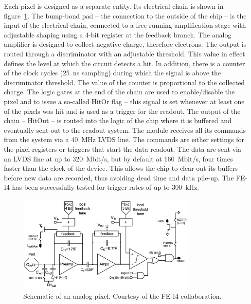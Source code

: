 Each pixel is designed as a separate entity. Its electrical chain is shown in figure~\ref{fig:anapix}. The bump-bond pad -- the connection to the outside of the chip -- is the input of the electrical chain, connected to a free-running amplification stage with adjustable shaping using a 4-bit register at the feedback branch. The analog amplifier is designed to collect negative charge, therefore electrons. The output is routed through a discriminator with an adjustable threshold. This value in effect defines the level at which the circuit detects a hit. In addition, there is a counter of the clock cycles (25~ns sampling) during which the signal is above the discriminator threshold. The value of the counter is proportional to the collected charge. The logic gates at the end of the chain are used to enable/disable the pixel and to issue a so-called HitOr flag -- this signal is set whenever at least one of the pixels was hit and is used as a trigger for the readout. The output of the chain -- HitOut -- is routed into the logic of the chip where it is buffered and eventually sent out to the readout system. The module receives all its commands from the system via a 40~MHz LVDS line. The commands are either settings for the pixel registers or triggers that start the data readout. The data are sent via an LVDS line at up to 320~Mbit/s, but by default at 160~Mbit/s, four times faster than the clock of the device. This allows the chip to clear out its buffers before new data are recorded, thus avoiding dead time and data pile-up. The FE-I4 has been successfully tested for trigger rates of up to 300~kHz. 

\begin{figure}[!t]
\centering
\includegraphics[width=0.8\textwidth]{04_charge_monitoring/pics/analogPix}
\caption{Schematic of an analog pixel. Courtesy of the FE-I4 collaboration.}
\label{fig:anapix}
\end{figure}

